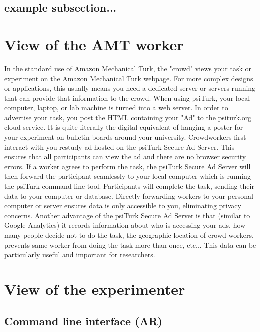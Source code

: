 \documentclass[jou,apacite]{apa6}
\begin{document}
\subsection{example subsection...}

\section{View of the AMT worker}


In the standard use of Amazon Mechanical Turk, the "crowd" views your task or experiment on the Amazon Mechanical Turk webpage.
For more complex designs or applications, this usually means you need a dedicated server or servers running that can provide that information to the crowd.
When using psiTurk, your local computer, laptop, or lab machine is turned into a web server.
In order to advertise your task, you post the HTML containing your "Ad" to the psiturk.org cloud service.
It is quite literally the digital equivalent of hanging a poster for your experiment on bulletin boards around your university.
Crowdworkers first interact  with you restudy ad hosted on the psiTurk Secure Ad Server.
This ensures that all participants can view the ad and there are no browser security errors.
If a worker agrees to perform the task, the psiTurk Secure Ad Server will then forward the participant seamlessly to your local computer which is running the psiTurk command line tool.
Participants will complete the task, sending their data to your computer or database.
Directly forwarding workers to your personal computer or server ensures data is only accessible to you, eliminating privacy concerns.
Another advantage of the psiTurk Secure Ad Server is that (similar to Google Analytics) it records information about who is accessing your ads, how many people decide not to do the task, the geographic location of crowd workers, prevents same worker from doing the task more than once, etc... 
This data can be particularly useful and important for researchers. 


\section{View of the experimenter}
\subsection{Command line interface (AR)}
\end{document}

